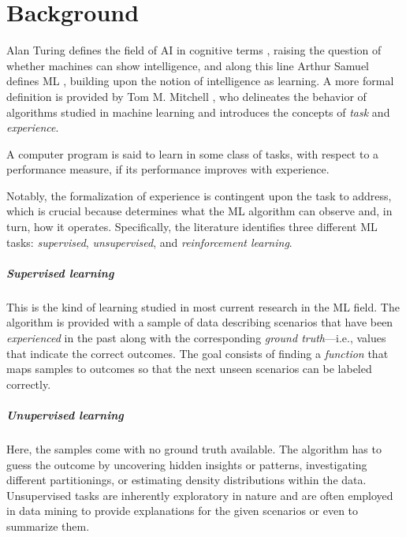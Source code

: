 \chapter{Background}
\label{chap:background}

Alan Turing defines the field of AI in cognitive terms \cite{turing1980computing}, raising the question of whether machines can show intelligence, and along this line Arthur Samuel defines ML \cite{samuel2000some}, building upon the notion of intelligence as learning.
A more formal definition is provided by Tom M. Mitchell \cite{mitchell1997machine}, who delineates the behavior of algorithms studied in machine learning and introduces the concepts of \textit{task} and \textit{experience}.
\begin{definition}
    A computer program is said to learn in some class of tasks, with respect to a performance measure, if its performance improves with experience.
\end{definition}
Notably, the formalization of experience is contingent upon the task to address, which is crucial because determines what the ML algorithm can observe and, in turn, how it operates.
Specifically, the literature identifies three different ML tasks: \textit{supervised}, \textit{unsupervised}, and \textit{reinforcement learning}.

\paragraph{Supervised learning} This is the kind of learning studied in most current research in the ML field. The algorithm is provided with a sample of data describing scenarios that have been \textit{experienced} in the past along with the corresponding \textit{ground truth}---i.e., values that indicate the correct outcomes.
The goal consists of finding a \textit{function} that maps samples to outcomes so that the next unseen scenarios can be labeled correctly.


\paragraph{Unupervised learning}
Here, the samples come with no ground truth available.
The algorithm has to guess the outcome by uncovering hidden insights or patterns, investigating different partitionings, or estimating density distributions within the data.
Unsupervised tasks are inherently exploratory in nature and are often employed in data mining to provide explanations for the given scenarios or even to summarize them.

